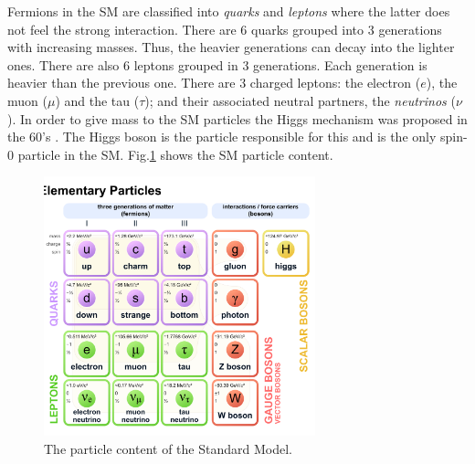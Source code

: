 Fermions in the SM are classified into \textit{quarks} and \textit{leptons} where the latter does not feel the strong interaction. There are 6 quarks grouped into 3 generations with increasing masses. Thus, the heavier generations can decay into the lighter ones. There are also 6 leptons grouped in 3 generations. Each generation is heavier than the previous one. There are 3 charged leptons: the electron ($e$), the muon ($\mu$) and the tau ($\tau$); and their associated neutral partners, the \textit{neutrinos} ($\nu$). In order to give mass to the SM particles the Higgs mechanism was proposed in the 60's \cite{PhysRevLett.13.508,PhysRevLett.13.321,PhysRevLett.13.585}. The Higgs boson is the particle responsible for this and is the only spin-0 particle in the SM. Fig.\ref{Fig14} shows the SM particle content.
\begin{figure}[h]
	\centering
	\includegraphics[width=0.7\textwidth]{figures/Fig14}
	\caption{The particle content of the Standard Model.}
	\label{Fig14}
\end{figure}
